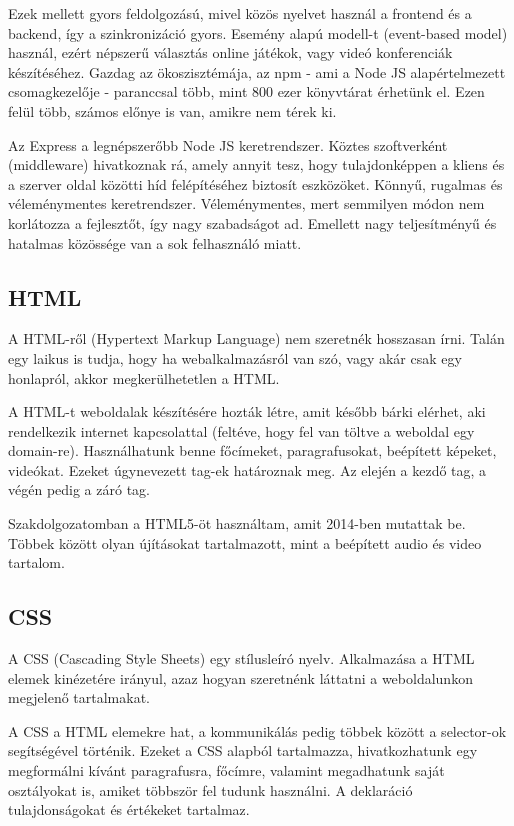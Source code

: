 Ezek mellett gyors feldolgozású, mivel közös nyelvet használ a frontend és a backend, így a szinkronizáció gyors. Esemény alapú modell-t (event-based model) használ, ezért népszerű választás online játékok, vagy videó konferenciák készítéséhez. Gazdag az ökoszisztémája, az npm - ami a Node JS alapértelmezett csomagkezelője - paranccsal több, mint 800 ezer könyvtárat érhetünk el. Ezen felül több, számos előnye is van, amikre nem térek ki.

Az Express a legnépszerőbb Node JS keretrendszer. Köztes szoftverként (middleware) hivatkoznak rá, amely annyit tesz, hogy tulajdonképpen a kliens és a szerver oldal közötti híd felépítéséhez biztosít eszközöket. Könnyű, rugalmas és véleménymentes keretrendszer. Véleménymentes, mert semmilyen módon nem korlátozza a fejlesztőt, így nagy szabadságot ad. Emellett nagy teljesítményű és hatalmas közössége van a sok felhasználó miatt.

\subsection{HTML}
A HTML-ről (Hypertext Markup Language) nem szeretnék hosszasan írni. Talán egy laikus is tudja, hogy ha webalkalmazásról van szó, vagy akár csak egy honlapról, akkor megkerülhetetlen a HTML.

A HTML-t weboldalak készítésére hozták létre, amit később bárki elérhet, aki rendelkezik internet kapcsolattal (feltéve, hogy fel van töltve a weboldal egy domain-re). Használhatunk benne főcímeket, paragrafusokat, beépített képeket, videókat. Ezeket úgynevezett tag-ek határoznak meg. Az elején a kezdő tag, a végén pedig a záró tag.

Szakdolgozatomban a HTML5-öt használtam, amit 2014-ben mutattak be. Többek között olyan újításokat tartalmazott, mint a beépített audio és video tartalom.

\subsection{CSS}

A CSS (Cascading Style Sheets) egy stílusleíró nyelv. Alkalmazása a HTML elemek kinézetére irányul, azaz hogyan szeretnénk láttatni a weboldalunkon megjelenő tartalmakat.

A CSS a HTML elemekre hat, a kommunikálás pedig többek között a selector-ok segítségével történik. Ezeket a CSS alapból tartalmazza, hivatkozhatunk egy megformálni kívánt paragrafusra, főcímre, valamint megadhatunk saját osztályokat is, amiket többször fel tudunk használni. A deklaráció tulajdonságokat és értékeket tartalmaz.

